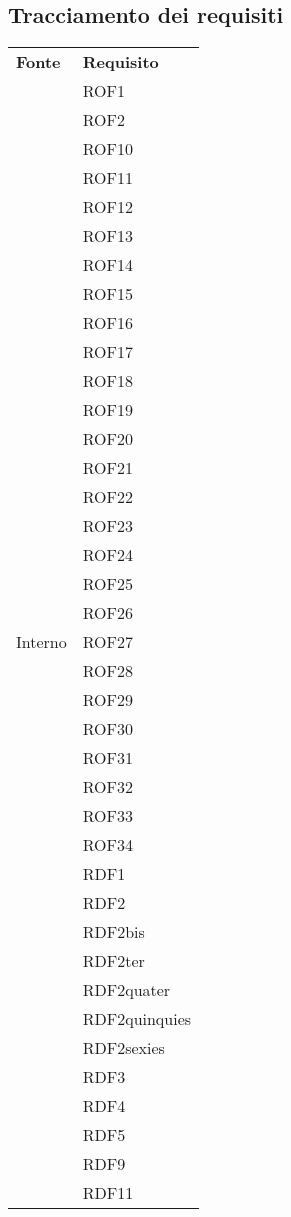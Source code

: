 \subsection{Tracciamento dei requisiti}
\begin{longtable}{| p{5cm} | p{5cm} |}
		\rowcolor{LightBlue}
		\color{white}\bfseries Fonte & \color{white}\bfseries Requisito \\[0.25cm]
\multirow[t]{61}{*}{Interno}		
				 & 	ROF1 \\
				&	ROF2 \\
				&	ROF10 \\
				&	ROF11 \\
				&	ROF12 \\
				&	ROF13 \\
				&	ROF14 \\
				&	ROF15 \\
				&	ROF16 \\
				&	ROF17 \\
				&	ROF18 \\
				&	ROF19 \\
				&	ROF20 \\
				&	ROF21 \\
				&	ROF22 \\
				& 	ROF23 \\
				& 	ROF24 \\
				& 	ROF25 \\
				& 	ROF26 \\
				& 	ROF27 \\
				& 	ROF28 \\
				& 	ROF29 \\
				& 	ROF30 \\
				& 	ROF31 \\
				& 	ROF32 \\
				& 	ROF33 \\
				& 	ROF34 \\
				&	RDF1 \\
				&	RDF2 \\
				&	RDF2bis \\
				&	RDF2ter \\
				&	RDF2quater \\
				&	RDF2quinquies \\
				&	RDF2sexies \\
				&	RDF3 \\
				&	RDF4 \\
				&	RDF5 \\
				&	RDF9 \\
				&	RDF11 \\

\end{longtable}
